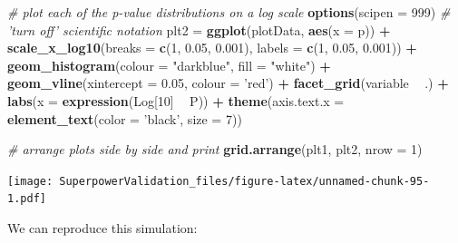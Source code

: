 \documentclass[
]{book}
\newenvironment{Shaded}{\begin{snugshade}}{\end{snugshade}}
\newcommand{\CommentTok}[1]{\textcolor[rgb]{0.56,0.35,0.01}{\textit{#1}}}
\newcommand{\DataTypeTok}[1]{\textcolor[rgb]{0.13,0.29,0.53}{#1}}
\newcommand{\DecValTok}[1]{\textcolor[rgb]{0.00,0.00,0.81}{#1}}
\newcommand{\FloatTok}[1]{\textcolor[rgb]{0.00,0.00,0.81}{#1}}
\newcommand{\KeywordTok}[1]{\textcolor[rgb]{0.13,0.29,0.53}{\textbf{#1}}}
\newcommand{\NormalTok}[1]{#1}
\newcommand{\OperatorTok}[1]{\textcolor[rgb]{0.81,0.36,0.00}{\textbf{#1}}}
\newcommand{\StringTok}[1]{\textcolor[rgb]{0.31,0.60,0.02}{#1}}
\begin{document}
\begin{Shaded}
\begin{Highlighting}[]
\CommentTok{# plot each of the p-value distributions on a log scale}
\KeywordTok{options}\NormalTok{(}\DataTypeTok{scipen =} \DecValTok{999}\NormalTok{) }\CommentTok{# 'turn off' scientific notation}
\NormalTok{plt2 =}\StringTok{ }\KeywordTok{ggplot}\NormalTok{(plotData, }\KeywordTok{aes}\NormalTok{(}\DataTypeTok{x =}\NormalTok{ p)) }\OperatorTok{+}
\KeywordTok{scale_x_log10}\NormalTok{(}\DataTypeTok{breaks =} \KeywordTok{c}\NormalTok{(}\DecValTok{1}\NormalTok{, }\FloatTok{0.05}\NormalTok{, }\FloatTok{0.001}\NormalTok{),}
\DataTypeTok{labels =} \KeywordTok{c}\NormalTok{(}\DecValTok{1}\NormalTok{, }\FloatTok{0.05}\NormalTok{, }\FloatTok{0.001}\NormalTok{)) }\OperatorTok{+}
\KeywordTok{geom_histogram}\NormalTok{(}\DataTypeTok{colour =} \StringTok{"darkblue"}\NormalTok{, }\DataTypeTok{fill =} \StringTok{"white"}\NormalTok{) }\OperatorTok{+}
\KeywordTok{geom_vline}\NormalTok{(}\DataTypeTok{xintercept =} \FloatTok{0.05}\NormalTok{, }\DataTypeTok{colour =} \StringTok{'red'}\NormalTok{) }\OperatorTok{+}
\KeywordTok{facet_grid}\NormalTok{(variable }\OperatorTok{~}\StringTok{ }\NormalTok{.) }\OperatorTok{+}
\KeywordTok{labs}\NormalTok{(}\DataTypeTok{x =} \KeywordTok{expression}\NormalTok{(Log[}\DecValTok{10}\NormalTok{] }\OperatorTok{~}\StringTok{ }\NormalTok{P)) }\OperatorTok{+}
\KeywordTok{theme}\NormalTok{(}\DataTypeTok{axis.text.x =} \KeywordTok{element_text}\NormalTok{(}\DataTypeTok{color =} \StringTok{'black'}\NormalTok{, }\DataTypeTok{size =} \DecValTok{7}\NormalTok{))}

\CommentTok{# arrange plots side by side and print}
\KeywordTok{grid.arrange}\NormalTok{(plt1, plt2, }\DataTypeTok{nrow =} \DecValTok{1}\NormalTok{)}
\end{Highlighting}
\end{Shaded}

\texttt{[image: SuperpowerValidation\_files/figure-latex/unnamed-chunk-95-1.pdf]}

We can reproduce this simulation:
\end{document}
